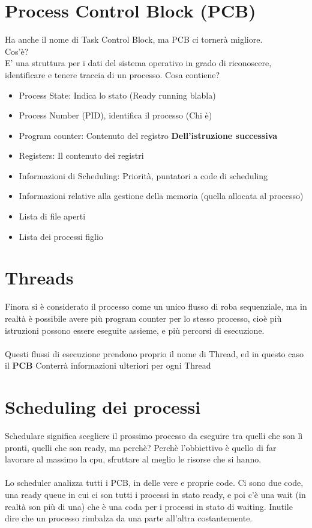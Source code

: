 \documentclass[12pt, a4paper, openany, twoside]{book}
\begin{document}
\section{Process Control Block (PCB)}
Ha anche il nome di Task Control Block, ma PCB ci tornerà migliore. \\
Cos'è? \\
E' una struttura per i dati del sistema operativo in grado di riconoscere, 
identificare e tenere traccia di un processo.
Cosa contiene?\\ 
\begin{itemize}
	\item Process State: Indica lo stato (Ready running blabla)
	\item Process Number (PID), identifica il processo (Chi è)
	\item Program counter: Contenuto del registro \color{red} \textbf{Dell'istruzione
	successiva} \color{black}
	\item Registers: Il contenuto dei registri
	\item Informazioni di Scheduling: Priorità, puntatori a code di scheduling
	\item Informazioni relative alla gestione della memoria (quella allocata al processo)
	\item Lista di file aperti
	\item Lista dei processi figlio
\end{itemize}
\section{Threads}
Finora si è considerato il processo come un unico flusso di roba sequenziale,
ma in realtà è possibile avere più program counter per lo stesso processo, cioè
più istruzioni possono essere eseguite assieme, e più percorsi di esecuzione.
\\ \\
Questi flussi di esecuzione prendono proprio il nome di Thread, ed in questo caso
il \textbf{PCB} Conterrà informazioni ulteriori per ogni Thread  
\section{Scheduling dei processi}
Schedulare significa scegliere il prossimo processo da eseguire tra quelli che 
son lì pronti, quelli che son ready, ma perchè? Perchè l'obbiettivo è quello di 
far lavorare al massimo la cpu, sfruttare al meglio le risorse che si hanno. \\
\\ 
Lo scheduler analizza tutti i PCB, in delle vere e proprie code. Ci sono due code,
una ready queue in cui ci son tutti i processi in stato ready, e poi c'è una 
wait (in realtà son più di una) che è una coda per i processi in stato di waiting.
Inutile dire che un processo rimbalza da una parte all'altra costantemente. 
\end{document}
